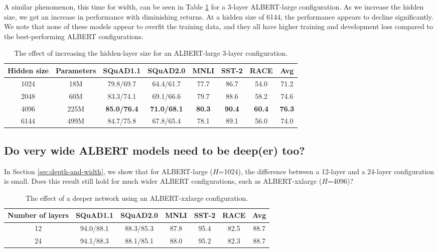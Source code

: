 A similar phenomenon, this time for width, can be seen in Table \ref{table:varying-width} for a 3-layer ALBERT-large configuration.
As we increase the hidden size, we get an increase in performance with diminishing returns.
At a hidden size of 6144, the performance appears to decline significantly.
We note that none of these models appear to overfit the training data, and they all have higher training and development loss compared to the best-performing ALBERT configurations.

\begin{table}[!htbp] 
\small
\centering
\begin{tabular}{ c  c | c c c c c | c }
Hidden size	& Parameters      	&SQuAD1.1	&SQuAD2.0	&MNLI	&SST-2	&RACE & Avg \\
\hline
1024    &18M    &79.8/69.7	&64.4/61.7	&77.7	&86.7	&54.0	&71.2\\
2048    &60M    &83.3/74.1	&69.1/66.6	&79.7	&88.6	&58.2	&74.6\\
4096    &225M   &\textbf{85.0/76.4}	&\textbf{71.0/68.1}	&\textbf{80.3}	&\textbf{90.4}	&\textbf{60.4}	&\textbf{76.3}\\
6144    &499M   &84.7/75.8	&67.8/65.4	&78.1	&89.1	&56.0	&74.0\\
\end{tabular}
\caption{The effect of increasing the hidden-layer size for an ALBERT-large 3-layer configuration.}
\label{table:varying-width}
\end{table}



\subsection{Do very wide ALBERT models need to be deep(er) too?}
In Section \ref{sec:depth-and-width}, we show that for ALBERT-large ($H$=1024), the difference between a 12-layer and a 24-layer configuration is small.
Does this result still hold for much wider ALBERT configurations, such as ALBERT-xxlarge ($H$=4096)?

\begin{table}[!htbp] 
\small
\centering
\begin{tabular}{ c |  c c c c c | c }
Number of layers		&SQuAD1.1	&SQuAD2.0	&MNLI	&SST-2	&RACE & Avg \\
\hline
12      &94.0/88.1	&88.3/85.3	&87.8	&95.4	&82.5   &88.7\\
24      &94.1/88.3	&88.1/85.1	&88.0	&95.2	&82.3	&88.7\\
\end{tabular}
\caption{The effect of a deeper network using an ALBERT-xxlarge configuration.}
\label{table:12-vs-24-ALBERT-xxlarge}
\end{table}

